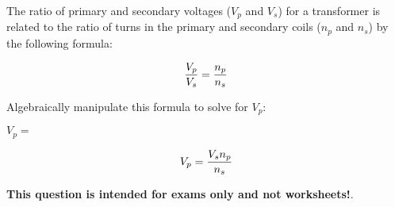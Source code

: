 

The ratio of primary and secondary voltages ($V_p$ and $V_s$) for a transformer is related to the ratio of turns in the primary and secondary coils ($n_p$ and $n_s$) by the following formula:

$${V_p \over V_s} = {n_p \over n_s}$$

Algebraically manipulate this formula to solve for $V_p$:

\vskip 20pt

$V_p = $







$$V_p = {{V_s n_p} \over n_s}$$







{\bf This question is intended for exams only and not worksheets!}.



